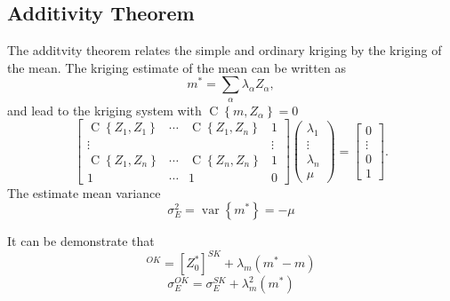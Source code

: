 \documentclass[twocolumn]{article}
\numberwithin{equation}{section}
\begin{document}
\subsection{Additivity Theorem}
The additvity theorem relates the simple and ordinary kriging by the kriging of the mean. The kriging estimate of the mean can be written as
\begin{equation}
	m^* = \sum_\alpha \lambda_\alpha Z_\alpha,
\end{equation}
and lead to the kriging system with $\operatorname{C}\left\{m,Z_\alpha\right\}=0$
\[
	\begin{bmatrix}
    	\operatorname{C}\left\{Z_1,Z_1\right\} 	& \cdots 	& \operatorname{C}\left\{Z_1,Z_n\right\} & 1  		\\
    	\vdots 									& 			& 										& \vdots 	\\
       		\operatorname{C}\left\{Z_1,Z_n\right\}  	& \cdots 	& \operatorname{C}\left\{Z_n,Z_n\right\}	& 1			\\
       		1										& \cdots	 	& 1										& 0
     	\end{bmatrix}
     	\begin{pmatrix}
       		\lambda_1 	\\
       		\vdots 		\\
       		\lambda_n	\\
       		\mu  
     	\end{pmatrix}
     	=
     	\begin{bmatrix}
       		0 	\\
       		\vdots 									\\
       		0 	\\
       		1
     	\end{bmatrix}.
\] 
The estimate mean variance 
\begin{equation}
	\sigma_E^2 = \operatorname{var}\left\{ m^* \right\} = -\mu
\end{equation}

It can be demonstrate that 
\begin{equation}
	[Z_0^*]^{OK} = [Z_0^*]^{SK} + \lambda_m(m^*-m)
\end{equation}
\begin{equation}
	\sigma_E^{OK} = \sigma_E^{SK} + \lambda_m^2(m^*)
\end{equation}
\end{document}
